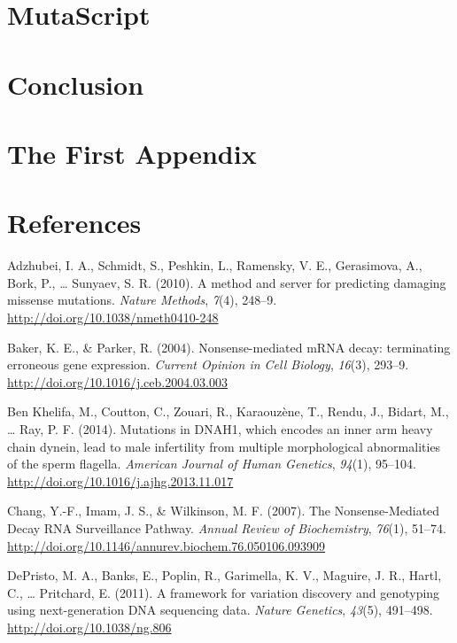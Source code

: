 \documentclass[12pt,twoside]{reedthesis}
\theoremstyle{definition}
\theoremstyle{definition}
\theoremstyle{remark}
\begin{document}
  \newpage
  
  \chapter{MutaScript}\label{mutascript}
  
  \chapter*{Conclusion}\label{conclusion}
  
  \chapter{The First Appendix}\label{the-first-appendix}
  
  \chapter*{References}\label{references}
  
  \hypertarget{refs}{}
  \hypertarget{ref-Adzhubei2010}{}
  Adzhubei, I. A., Schmidt, S., Peshkin, L., Ramensky, V. E., Gerasimova,
  A., Bork, P., \ldots{} Sunyaev, S. R. (2010). A method and server for
  predicting damaging missense mutations. \emph{Nature Methods},
  \emph{7}(4), 248--9. \url{http://doi.org/10.1038/nmeth0410-248}
  
  \hypertarget{ref-Baker2004}{}
  Baker, K. E., \& Parker, R. (2004). Nonsense-mediated mRNA decay:
  terminating erroneous gene expression. \emph{Current Opinion in Cell
  Biology}, \emph{16}(3), 293--9.
  \url{http://doi.org/10.1016/j.ceb.2004.03.003}
  
  \hypertarget{ref-BenKhelifa2014}{}
  Ben Khelifa, M., Coutton, C., Zouari, R., Karaouzène, T., Rendu, J.,
  Bidart, M., \ldots{} Ray, P. F. (2014). Mutations in DNAH1, which
  encodes an inner arm heavy chain dynein, lead to male infertility from
  multiple morphological abnormalities of the sperm flagella.
  \emph{American Journal of Human Genetics}, \emph{94}(1), 95--104.
  \url{http://doi.org/10.1016/j.ajhg.2013.11.017}
  
  \hypertarget{ref-Chang2007}{}
  Chang, Y.-F., Imam, J. S., \& Wilkinson, M. F. (2007). The
  Nonsense-Mediated Decay RNA Surveillance Pathway. \emph{Annual Review of
  Biochemistry}, \emph{76}(1), 51--74.
  \url{http://doi.org/10.1146/annurev.biochem.76.050106.093909}
  
  \hypertarget{ref-DePristo2011}{}
  DePristo, M. A., Banks, E., Poplin, R., Garimella, K. V., Maguire, J.
  R., Hartl, C., \ldots{} Pritchard, E. (2011). A framework for variation
  discovery and genotyping using next-generation DNA sequencing data.
  \emph{Nature Genetics}, \emph{43}(5), 491--498.
  \url{http://doi.org/10.1038/ng.806}
  
\end{document}
